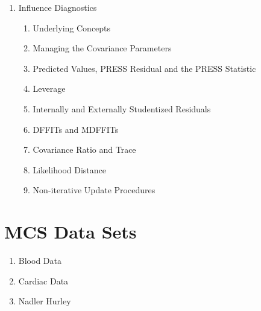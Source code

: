 \documentclass[12pt, a4paper]{article}
\theoremstyle{plain}
\theoremstyle{definition}
\theoremstyle{remark}
\begin{document}
\begin{enumerate}
\item Influence Diagnostics
    \begin{enumerate}
    \item Underlying Concepts
    \item Managing the Covariance Parameters
    \item Predicted Values, PRESS Residual and the PRESS Statistic
    \item Leverage
    \item Internally and Externally Studentized Residuals
    \item DFFITs and MDFFITs
    \item Covariance Ratio and Trace
    \item Likelihood Distance
    \item Non-iterative Update Procedures
    \end{enumerate}
\end{enumerate}
\newpage
\section{MCS Data Sets}
\begin{enumerate}
\item Blood Data
\item Cardiac Data
\item Nadler Hurley 
\end{enumerate}
\end{document}

